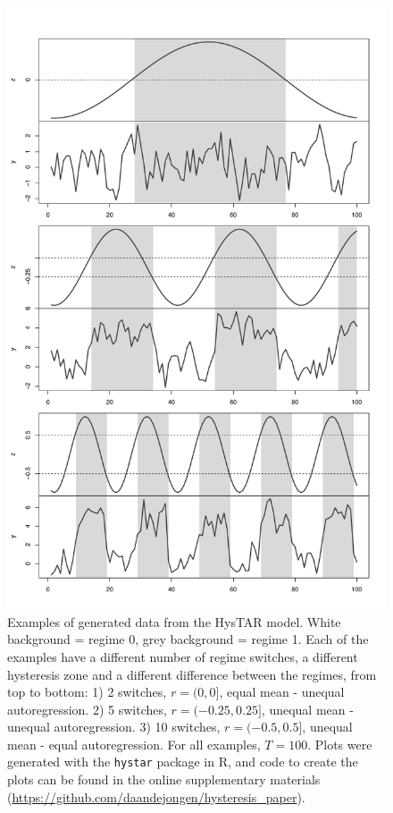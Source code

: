 \documentclass{article}
\begin{document}
\begin{figure} 
\begin{center}
\includegraphics[scale=.65]{simulation_examples}
\end{center}
\caption{Examples of generated data from the HysTAR model. White background = regime 0, grey background = regime 1. Each of the examples have a different number of regime switches, a different hysteresis zone and a different difference between the regimes, from top to bottom: 1) 2 switches, $r = (0, 0]$, equal mean - unequal autoregression. 2) 5 switches, $r = (-0.25, 0.25]$, unequal mean - unequal autoregression. 3) 10 switches, $r = (-0.5, 0.5]$, unequal mean - equal autoregression. For all examples, $T = 100$. Plots were generated with the \texttt{hystar} package in \textsf{R}, and code to create the plots can be found in the online supplementary materials (\url{https://github.com/daandejongen/hysteresis_paper}).}
\label{fig:ts_examples}
\end{figure}
\end{document}
